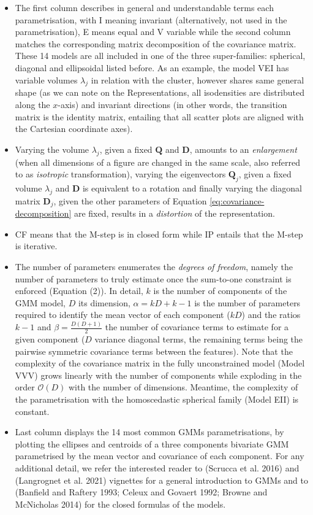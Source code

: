 \begin{itemize}
\item
  The first column describes in general and understandable terms each parametrisation, with I meaning invariant (alternatively, not used in the parametrisation), E means equal and V variable while the second column matches the corresponding matrix decomposition of the covariance matrix. These 14 models are all included in one of the three super-families: spherical, diagonal and ellipsoidal listed before. As an example, the model VEI has variable volumes \(\lambda_j\) in relation with the cluster, however shares same general shape (as we can note on the Representations, all isodensities are distributed along the \(x\)-axis) and invariant directions (in other words, the transition matrix is the identity matrix, entailing that all scatter plots are aligned with the Cartesian coordinate axes).
\item
  Varying the volume \(\lambda_j\), given a fixed \(\boldsymbol{Q}\) and \(\boldsymbol{D}\), amounts to an \emph{enlargement} (when all dimensions of a figure are changed in the same scale, also referred to as \emph{isotropic} transformation), varying the eigenvectors \(\boldsymbol{Q}_j\), given a fixed volume \(\lambda_j\) and \(\boldsymbol{D}\) is equivalent to a rotation and finally varying the diagonal matrix \(\boldsymbol{D}_j\), given the other parameters of Equation \eqref{eq:covariance-decomposition} are fixed, results in a \emph{distortion} of the representation.
\item
  CF means that the M-step is in closed form while IP entails that the M-step is iterative.
\item
  The number of parameters enumerates the \emph{degrees of freedom}, namely the number of parameters to truly estimate once the sum-to-one constraint is enforced (Equation (2)). In detail, \(k\) is the number of components of the GMM model, \(D\) its dimension, \(\alpha=kD + k - 1\) is the number of parameters required to identify the mean vector of each component (\(kD\)) and the ratios \(k-1\) and \(\beta=\frac{D(D+1)}{2}\) the number of covariance terms to estimate for a given component (\(D\) variance diagonal terms, the remaining terms being the pairwise symmetric covariance terms between the features). Note that the complexity of the covariance matrix in the fully unconstrained model (Model VVV) grows linearly with the number of components while exploding in the order \(\mathcal{O}(D)\) with the number of dimensions. Meantime, the complexity of the parametrisation with the homoscedastic spherical family (Model EII) is constant.
\item
  Last column displays the 14 most common GMMs parametrisations, by plotting the ellipses and centroids of a three components bivariate GMM parametrised by the mean vector and covariance of each component. For any additional detail, we refer the interested reader to  (Scrucca et al. 2016) and  (Langrognet et al. 2021) vignettes for a general introduction to GMMs and to (Banfield and Raftery 1993; Celeux and Govaert 1992; Browne and McNicholas 2014) for the closed formulas of the models.
\end{itemize}

